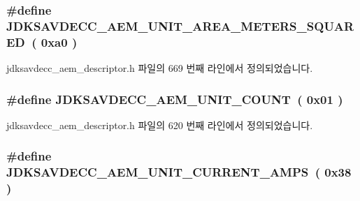 \subsubsection[{\texorpdfstring{J\+D\+K\+S\+A\+V\+D\+E\+C\+C\+\_\+\+A\+E\+M\+\_\+\+U\+N\+I\+T\+\_\+\+A\+R\+E\+A\+\_\+\+M\+E\+T\+E\+R\+S\+\_\+\+S\+Q\+U\+A\+R\+ED}{JDKSAVDECC_AEM_UNIT_AREA_METERS_SQUARED}}]{\setlength{\rightskip}{0pt plus 5cm}\#define J\+D\+K\+S\+A\+V\+D\+E\+C\+C\+\_\+\+A\+E\+M\+\_\+\+U\+N\+I\+T\+\_\+\+A\+R\+E\+A\+\_\+\+M\+E\+T\+E\+R\+S\+\_\+\+S\+Q\+U\+A\+R\+ED~( 0xa0 )}\hypertarget{group__units_ga1b33f37d242c14bea22ef74f528e195b}{}\label{group__units_ga1b33f37d242c14bea22ef74f528e195b}


jdksavdecc\+\_\+aem\+\_\+descriptor.\+h 파일의 669 번째 라인에서 정의되었습니다.

\subsubsection[{\texorpdfstring{J\+D\+K\+S\+A\+V\+D\+E\+C\+C\+\_\+\+A\+E\+M\+\_\+\+U\+N\+I\+T\+\_\+\+C\+O\+U\+NT}{JDKSAVDECC_AEM_UNIT_COUNT}}]{\setlength{\rightskip}{0pt plus 5cm}\#define J\+D\+K\+S\+A\+V\+D\+E\+C\+C\+\_\+\+A\+E\+M\+\_\+\+U\+N\+I\+T\+\_\+\+C\+O\+U\+NT~( 0x01 )}\hypertarget{group__units_ga3b96b0f9f3c1f39c75d7c71e29f6d234}{}\label{group__units_ga3b96b0f9f3c1f39c75d7c71e29f6d234}


jdksavdecc\+\_\+aem\+\_\+descriptor.\+h 파일의 620 번째 라인에서 정의되었습니다.

\subsubsection[{\texorpdfstring{J\+D\+K\+S\+A\+V\+D\+E\+C\+C\+\_\+\+A\+E\+M\+\_\+\+U\+N\+I\+T\+\_\+\+C\+U\+R\+R\+E\+N\+T\+\_\+\+A\+M\+PS}{JDKSAVDECC_AEM_UNIT_CURRENT_AMPS}}]{\setlength{\rightskip}{0pt plus 5cm}\#define J\+D\+K\+S\+A\+V\+D\+E\+C\+C\+\_\+\+A\+E\+M\+\_\+\+U\+N\+I\+T\+\_\+\+C\+U\+R\+R\+E\+N\+T\+\_\+\+A\+M\+PS~( 0x38 )}\hypertarget{group__units_gaacc2dfa0c291803623740528d1fc1fd9}{}\label{group__units_gaacc2dfa0c291803623740528d1fc1fd9}



